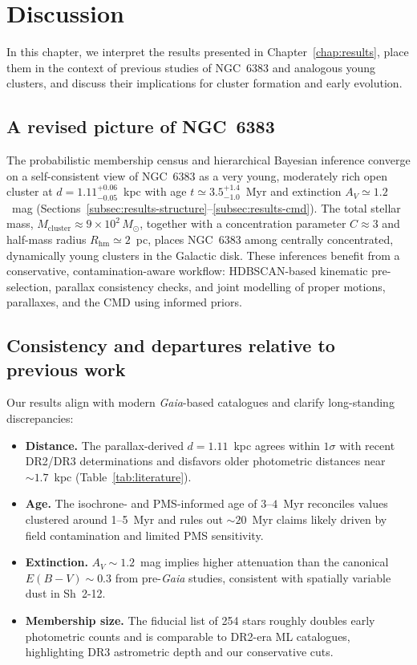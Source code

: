 \documentclass[../main.tex]{subfiles}
\begin{document}
\section{Discussion}
\label{chap:discussion}

In this chapter, we interpret the results presented in Chapter~\ref{chap:results}, place them in the context of previous studies of NGC~6383 and analogous young clusters, and discuss their implications for cluster formation and early evolution.

\subsection{A revised picture of NGC~6383}
\label{subsec:discussion-summary}

The probabilistic membership census and hierarchical Bayesian inference converge on a self-consistent view of NGC~6383 as a very young, moderately rich open cluster at $d=1.11^{+0.06}_{-0.05}$~kpc with age $t\simeq3.5^{+1.4}_{-1.0}$~Myr and extinction $A_V\simeq1.2$~mag (Sections~\ref{subsec:results-structure}--\ref{subsec:results-cmd}). The total stellar mass, $M_{\text{cluster}}\approx9\times10^2\,M_\odot$, together with a concentration parameter $C\approx3$ and half-mass radius $R_{\text{hm}}\simeq2$~pc, places NGC~6383 among centrally concentrated, dynamically young clusters in the Galactic disk. These inferences benefit from a conservative, contamination-aware workflow: HDBSCAN-based kinematic pre-selection, parallax consistency checks, and joint modelling of proper motions, parallaxes, and the CMD using informed priors.

\subsection{Consistency and departures relative to previous work}
\label{subsec:discussion-literature}

Our results align with modern \textit{Gaia}-based catalogues and clarify long-standing discrepancies:

\begin{itemize}
  \item \textbf{Distance.} The parallax-derived $d=1.11$~kpc agrees within $1\sigma$ with recent DR2/DR3 determinations and disfavors older photometric distances near $\sim1.7$~kpc (Table~\ref{tab:literature}).
  \item \textbf{Age.} The isochrone- and PMS-informed age of $3$--$4$~Myr reconciles values clustered around 1--5~Myr and rules out $\sim20$~Myr claims likely driven by field contamination and limited PMS sensitivity.
  \item \textbf{Extinction.} $A_V\!\sim\!1.2$~mag implies higher attenuation than the canonical $E(B\!-\!V)\!\sim\!0.3$ from pre-\textit{Gaia} studies, consistent with spatially variable dust in Sh~2-12.
  \item \textbf{Membership size.} The fiducial list of 254 stars roughly doubles early photometric counts and is comparable to DR2-era ML catalogues, highlighting DR3 astrometric depth and our conservative cuts.
\end{itemize}
\end{document}
